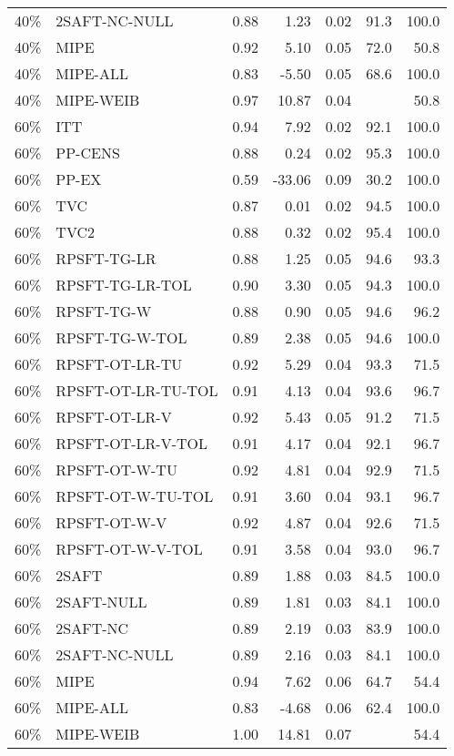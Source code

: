 \begin{table}[ht]
{\begin{tabular}{llrrrrr}
  40\% & 2SAFT-NC-NULL & 0.88 & 1.23 & 0.02 & 91.3 & 100.0 \\ 
  40\% & MIPE & 0.92 & 5.10 & 0.05 & 72.0 & 50.8 \\ 
  40\% & MIPE-ALL & 0.83 & -5.50 & 0.05 & 68.6 & 100.0 \\ 
  40\% & MIPE-WEIB & 0.97 & 10.87 & 0.04 &  & 50.8 \\ 
   \hline
60\% & ITT & 0.94 & 7.92 & 0.02 & 92.1 & 100.0 \\ 
  60\% & PP-CENS & 0.88 & 0.24 & 0.02 & 95.3 & 100.0 \\ 
  60\% & PP-EX & 0.59 & -33.06 & 0.09 & 30.2 & 100.0 \\ 
  60\% & TVC & 0.87 & 0.01 & 0.02 & 94.5 & 100.0 \\ 
  60\% & TVC2 & 0.88 & 0.32 & 0.02 & 95.4 & 100.0 \\ 
   \hline
60\% & RPSFT-TG-LR & 0.88 & 1.25 & 0.05 & 94.6 & 93.3 \\ 
  60\% & RPSFT-TG-LR-TOL & 0.90 & 3.30 & 0.05 & 94.3 & 100.0 \\ 
  60\% & RPSFT-TG-W & 0.88 & 0.90 & 0.05 & 94.6 & 96.2 \\ 
  60\% & RPSFT-TG-W-TOL & 0.89 & 2.38 & 0.05 & 94.6 & 100.0 \\ 
  60\% & RPSFT-OT-LR-TU & 0.92 & 5.29 & 0.04 & 93.3 & 71.5 \\ 
  60\% & RPSFT-OT-LR-TU-TOL & 0.91 & 4.13 & 0.04 & 93.6 & 96.7 \\ 
  60\% & RPSFT-OT-LR-V & 0.92 & 5.43 & 0.05 & 91.2 & 71.5 \\ 
  60\% & RPSFT-OT-LR-V-TOL & 0.91 & 4.17 & 0.04 & 92.1 & 96.7 \\ 
   \hline
60\% & RPSFT-OT-W-TU & 0.92 & 4.81 & 0.04 & 92.9 & 71.5 \\ 
  60\% & RPSFT-OT-W-TU-TOL & 0.91 & 3.60 & 0.04 & 93.1 & 96.7 \\ 
  60\% & RPSFT-OT-W-V & 0.92 & 4.87 & 0.04 & 92.6 & 71.5 \\ 
  60\% & RPSFT-OT-W-V-TOL & 0.91 & 3.58 & 0.04 & 93.0 & 96.7 \\ 
   \hline
60\% & 2SAFT & 0.89 & 1.88 & 0.03 & 84.5 & 100.0 \\ 
  60\% & 2SAFT-NULL & 0.89 & 1.81 & 0.03 & 84.1 & 100.0 \\ 
  60\% & 2SAFT-NC & 0.89 & 2.19 & 0.03 & 83.9 & 100.0 \\ 
  60\% & 2SAFT-NC-NULL & 0.89 & 2.16 & 0.03 & 84.1 & 100.0 \\ 
  60\% & MIPE & 0.94 & 7.62 & 0.06 & 64.7 & 54.4 \\ 
  60\% & MIPE-ALL & 0.83 & -4.68 & 0.06 & 62.4 & 100.0 \\ 
  60\% & MIPE-WEIB & 1.00 & 14.81 & 0.07 &  & 54.4 \\ 
   \hline
\end{tabular}
}
\end{table}
